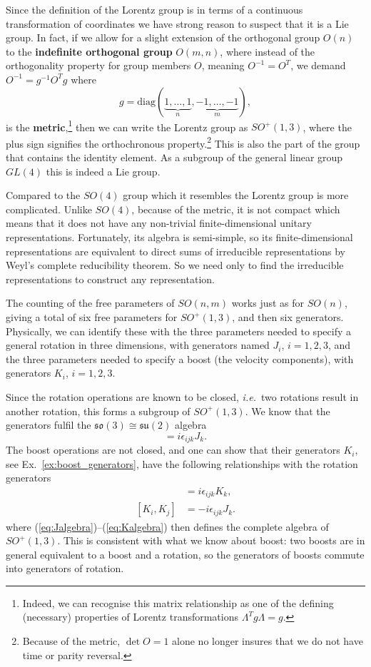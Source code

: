 \documentclass[notes.tex]{subfiles}
\begin{document}
Since the definition of the Lorentz group is in terms of a continuous transformation of coordinates we have strong reason to suspect that it is a Lie group. In fact, if we allow for a slight extension of the orthogonal group $O(n)$ to the {\bf indefinite orthogonal group} $O(m,n)$, where instead of the orthogonality property for group members $O$, meaning $O^{-1}=O^T$, we demand $O^{-1}=g^{-1}O^Tg$ where
\[g=\text{diag}(\underbrace{1,\ldots,1}_n,\underbrace{-1,\ldots,-1}_m),\] is the {\bf metric},\footnote{Indeed, we can recognise this matrix relationship as one of the defining (necessary) properties of Lorentz transformations $\Lambda^Tg\Lambda=g$.} then we can write the Lorentz group as $SO^+(1,3)$, where the plus sign signifies the orthochronous property.\footnote{Because of the metric, $\det O=1$ alone no longer insures that we do not have time or parity reversal.} This is also the part of the group that contains the identity element. As a subgroup of the general linear group $GL(4)$ this is indeed a Lie group.

Compared to the $SO(4)$ group which it resembles the Lorentz group is more complicated. Unlike $SO(4)$, because of the metric, it is not compact which means that it does not have any non-trivial finite-dimensional unitary representations. Fortunately, its algebra is semi-simple, so its finite-dimensional representations are equivalent to direct sums of irreducible representations by Weyl’s complete reducibility theorem. So we need only to find the irreducible representations to construct any representation.

The counting of the free parameters of $SO(n,m)$ works just as for $SO(n)$, giving a total of six free parameters for  $SO^+(1,3)$, and then six generators. Physically, we can identify these with the three parameters needed to specify a general rotation in three dimensions, with generators named $J_i$, $i=1,2,3$, and the three parameters needed to specify a boost (the velocity components), with generators $K_i$, $i=1,2,3$.

Since the rotation operations are known to be closed, {\it i.e.}\ two rotations result in another rotation, this forms a subgroup of $SO^+(1,3)$. We know that the generators fulfil the $\mathfrak{so}(3)\cong\mathfrak{su}(2)$ algebra
\begin{equation}
[J_i,J_j]=i\epsilon_{ijk}J_k.\label{eq:Jalgebra}
\end{equation}
The boost operations are not closed, and one can show that their generators $K_i$, see Ex.~\ref{ex:boost_generators}, have the following relationships with the rotation generators
\begin{align}
[K_i,J_j] &= i \epsilon_{ijk}K_k, \label{eq:KJalgebra} \\
[K_i,K_j] &= -i\epsilon_{ijk}J_k. \label{eq:Kalgebra}
\end{align}
where (\ref{eq:Jalgebra})--(\ref{eq:Kalgebra}) then defines the complete algebra of $SO^+(1,3)$. This is consistent with what we know about boost: two boosts are in general equivalent to a boost and a rotation, so the generators of boosts commute into generators of rotation.
\end{document}
